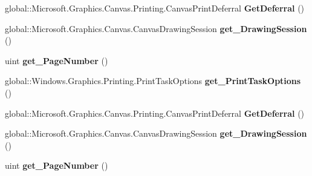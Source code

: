 \begin{DoxyCompactItemize}
global\+::\+Microsoft.\+Graphics.\+Canvas.\+Printing.\+Canvas\+Print\+Deferral {\bfseries Get\+Deferral} ()
\item 
\mbox{\label{interface_microsoft_1_1_graphics_1_1_canvas_1_1_printing_1_1_i_canvas_preview_event_args_a3986afef79f94250c88e589b3a6c7bf8}} 
global\+::\+Microsoft.\+Graphics.\+Canvas.\+Canvas\+Drawing\+Session {\bfseries get\+\_\+\+Drawing\+Session} ()
\item 
\mbox{\label{interface_microsoft_1_1_graphics_1_1_canvas_1_1_printing_1_1_i_canvas_preview_event_args_a3a70ed88006f13b80460bcacd2b53cc4}} 
uint {\bfseries get\+\_\+\+Page\+Number} ()
\item 
\mbox{\label{interface_microsoft_1_1_graphics_1_1_canvas_1_1_printing_1_1_i_canvas_preview_event_args_a90316527a368a9c28b4a5f6c48a79ff5}} 
global\+::\+Windows.\+Graphics.\+Printing.\+Print\+Task\+Options {\bfseries get\+\_\+\+Print\+Task\+Options} ()
\item 
\mbox{\label{interface_microsoft_1_1_graphics_1_1_canvas_1_1_printing_1_1_i_canvas_preview_event_args_ac14e8353363cc191ad46607fb56c0566}} 
global\+::\+Microsoft.\+Graphics.\+Canvas.\+Printing.\+Canvas\+Print\+Deferral {\bfseries Get\+Deferral} ()
\item 
\mbox{\label{interface_microsoft_1_1_graphics_1_1_canvas_1_1_printing_1_1_i_canvas_preview_event_args_a3986afef79f94250c88e589b3a6c7bf8}} 
global\+::\+Microsoft.\+Graphics.\+Canvas.\+Canvas\+Drawing\+Session {\bfseries get\+\_\+\+Drawing\+Session} ()
\item 
\mbox{\label{interface_microsoft_1_1_graphics_1_1_canvas_1_1_printing_1_1_i_canvas_preview_event_args_a3a70ed88006f13b80460bcacd2b53cc4}} 
uint {\bfseries get\+\_\+\+Page\+Number} ()
\item 

\end{DoxyCompactItemize}
